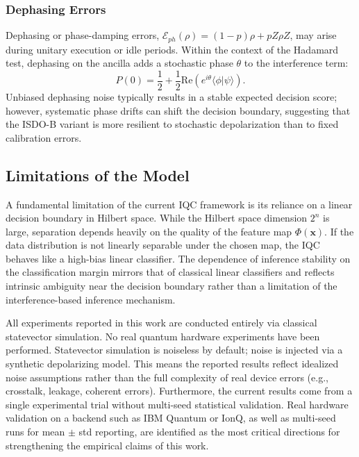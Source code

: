 \documentclass[conference]{IEEEtran}
\begin{document}
\subsubsection{Dephasing Errors}
Dephasing or phase-damping errors, $\mathcal{E}_{ph}(\rho) = (1-p)\rho + p Z\rho Z$, may arise during unitary execution or idle periods. Within the context of the Hadamard test, dephasing on the ancilla adds a stochastic phase $\theta$ to the interference term:
\begin{equation}
    P(0) = \frac{1}{2} + \frac{1}{2} \text{Re}(e^{i\theta} \langle \phi | \psi \rangle).
\end{equation}
Unbiased dephasing noise typically results in a stable expected decision score; however, systematic phase drifts can shift the decision boundary, suggesting that the ISDO-B variant is more resilient to stochastic depolarization than to fixed calibration errors.

\subsection{Limitations of the Model}
A fundamental limitation of the current IQC framework is its reliance on a linear decision boundary in Hilbert space. While the Hilbert space dimension $2^n$ is large, separation depends heavily on the quality of the feature map $\Phi(\mathbf{x})$. If the data distribution is not linearly separable under the chosen map, the IQC behaves like a high-bias linear classifier. The dependence of inference stability on the classification margin mirrors that of classical linear classifiers and reflects intrinsic ambiguity near the decision boundary rather than a limitation of the interference-based inference mechanism.

All experiments reported in this work are conducted entirely via classical statevector simulation. No real quantum hardware experiments have been performed. Statevector simulation is noiseless by default; noise is injected via a synthetic depolarizing model. This means the reported results reflect idealized noise assumptions rather than the full complexity of real device errors (e.g., crosstalk, leakage, coherent errors). Furthermore, the current results come from a single experimental trial without multi-seed statistical validation. Real hardware validation on a backend such as IBM Quantum or IonQ, as well as multi-seed runs for mean $\pm$ std reporting, are identified as the most critical directions for strengthening the empirical claims of this work.
\end{document}
